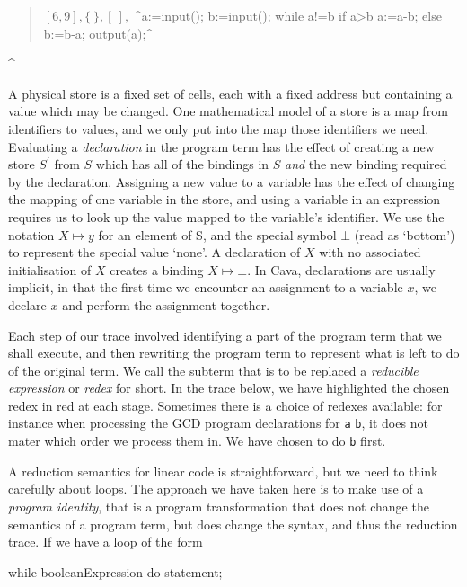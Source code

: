 \documentclass[11pt]{book}
\begin{document}
\begin{quote}
\hspace{-1.2cm}$  [6, 9], \{\ \}, [\ ],$ 
^a:=input(); b:=input(); while a!=b if a>b a:=a-b; else b:=b-a; output(a);^$  $
\end{quote}
\lstDeleteShortInline^

A physical store is a fixed set of cells, each with a fixed address but containing a value which may be changed. One mathematical model of a store is a map from identifiers to values, and we only put into the map those identifiers we need. Evaluating a {\em declaration} in the program term has the effect of creating a new store $S^\prime$ from $S$ which has all of the bindings in $S$ {\em and} the new binding required by the declaration. Assigning a new value to a variable has the effect of changing the mapping of one variable in the store, and using a variable in an expression requires us to look up the value mapped to the variable's identifier. We use the notation $X\mapsto y$ for an element of S, and the special symbol $\bot$ (read as `bottom') to represent the special value `none'. A declaration of $X$ with no associated initialisation of $X$ creates a binding $X\mapsto\bot$. In Cava, declarations are usually implicit, in that the first time we encounter an assignment to a variable $x$, we declare $x$ and perform the assignment together.

Each step of our trace involved identifying a part of the program term that we shall execute, and then rewriting the program term to represent what is left to do of the original term. We call the subterm that is to be replaced a {\em reducible expression} or {\em redex} for short. In the trace below, we have highlighted the chosen redex in red at each stage. Sometimes there is a choice of redexes available: for instance when processing the GCD program declarations for {\tt a} {\tt b}, it does not mater which order we process them in. We have chosen to do {\tt b} first.

A reduction semantics for linear code is straightforward, but we need to think carefully about loops. The approach we have taken here is to make use of a {\em program identity}, that is a program transformation that does not change the semantics of a program term, but does change the syntax, and thus the reduction trace. If we have a loop of the form

\begin{codeblock}
while booleanExpression do statement;
\end{codeblock}
\end{document}
